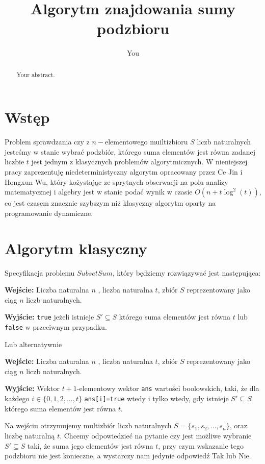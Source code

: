 \documentclass{article}
\title{Algorytm znajdowania sumy podzbioru}
\author{You}
\begin{document}
\maketitle

\begin{abstract}
Your abstract.
\end{abstract}

\section{Wstęp}
Problem sprawdzania czy z $n-$elementowego muiltizbioru $S$ liczb naturalnych jesteśmy w stanie wybrać podzbiór, którego suma elementów jest równa zadanej liczbie $t$ jest jednym z klasycznych problemów algorytmicznych. W nieniejszej pracy zaprezentuję niedeterministyczny algorytm opracowany przez Ce Jin i Hongxun Wu, który kożystając ze sprytnych obserwacji na polu analizy matematycznej i algebry jest w stanie podać wynik w czasie $O(n+t\log^2(t))$, co jest czasem znacznie szybszym niż klasyczny algorytm oparty na programowanie dynamiczne. 



\section{Algorytm klasyczny}
Specyfikacja problemu $SubsetSum$, który będziemy rozwiązywać jest następująca:

\begin{tcolorbox}
    \textbf{Wejście:} Liczba naturalna $n$ , liczba naturalna $t$, zbiór $S$ reprezentowany jako ciąg $n$ liczb naturalnych.
    
    \textbf{Wyjście:} \texttt{true} jeżeli istnieje $S' \subseteq S$ którego suma elementów jest równa $t$ lub \texttt{false} w przeciwnym przypadku.
\end{tcolorbox}
Lub alternatywnie
\begin{tcolorbox}
    \textbf{Wejście:} Liczba naturalna $n$ , liczba naturalna $t$, zbiór $S$ reprezentowany jako ciąg $n$ liczb naturalnych.
    
    \textbf{Wyjście:} Wektor $t+1$-elementowy wektor \texttt{ans} wartości boolowskich, taki, że dla każdego
    $i \in \{0,1,2,...,t\}$ \texttt{ans[i]=true} wtedy i tylko wtedy, gdy
    istnieje $S' \subseteq S$ którego suma elementów jest równa $t$.
\end{tcolorbox}

Na wejściu otrzymujemy multizbiór liczb naturalnych $S=\{s_1,s_2,...,s_n\}$, oraz 
liczbę naturalną $t$. Chcemy odpowiedzieć na pytanie czy jest możliwe wybranie 
$S' \subseteq S$ taki, że suma jego elementów jest równa $t$, przy czym wskazanie tego 
podzbioru nie jest konieczne, a wystarczy nam jedynie odpowiedź Tak lub Nie. 
\end{document}
